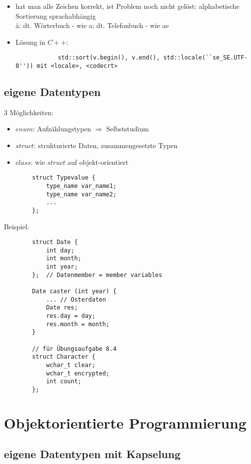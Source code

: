 \documentclass{article}
\begin{document}
	\begin{itemize}
		\item hat man alle Zeichen korrekt, ist Problem noch nicht gelöst: alphabetische Sortierung sprachabhängig \\
		ä: dt. Wörterbuch - wie a; dt. Telefonbuch - wie ae
		\item Lösung in $C++$: 
		\begin{lstlisting}
			std::sort(v.begin(), v.end(), std::locale(``se_SE.UTF-8'')) mit <locale>, <codecrt>
		\end{lstlisting}
	\end{itemize}

	\subsection{eigene Datentypen}
	$3$ Möglichkeiten:
	\begin{itemize}
		\item $enum$: Aufzählungstypen $\Rightarrow $ Selbststudium
		\item $struct$: strukturierte Daten, zusammengesetzte Typen
		\item $class$: wie $struct$ auf objekt-orientiert
	\end{itemize}

	\begin{lstlisting}
		struct Typevalue {
			type_name var_name1;
			type_name var_name2;
			...
		};
	\end{lstlisting}
	Beispiel:
	\begin{lstlisting}
		struct Date {
			int day;
			int month;
			int year;
		};  // Datenmember = member variables 

		Date caster (int year) {
			... // Osterdaten
			Date res;
			res.day = day;
			res.month = month;
		}

		// für Übungsaufgabe 8.4
		struct Character {
			wchar_t clear;
			wchar_t encrypted;
			int count;
		};
	\end{lstlisting}


\section{Objektorientierte Programmierung}

\subsection{eigene Datentypen mit Kapselung}
\end{document}
